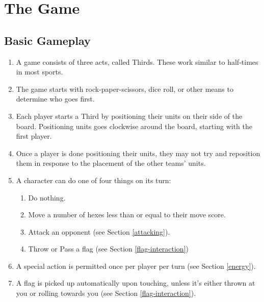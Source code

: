 \chapter{The Game}
\section{Basic Gameplay} \label{basic-gameplay}
\begin{enumerate}
    \item A game consists of three acts, called Thirds.
    These work similar to half-times in most sports.
    \item The game starts with rock-paper-scissors, dice roll, or other means to determine who goes first.
    \item Each player starts a Third by positioning their units on their side of the board.
    Positioning units goes clockwise around the board, starting with the first player.
    \item Once a player is done positioning their units, they may not try and reposition them in response to the placement of the other teams’ units.
    \item A character can do one of four things on its turn:
    \begin{enumerate}
        \item Do nothing.
        \item Move a number of hexes less than or equal to their move score.
        \item Attack an opponent (see Section \ref{attacking}).
        \item Throw or Pass a flag (see Section \ref{flag-interaction})
    \end{enumerate}
    \item A special action is permitted once per player per turn (see Section \ref{energy}).
    \item A flag is picked up automatically upon touching, unless it’s either thrown at you or rolling towards you (see Section \ref{flag-interaction}).
\end{enumerate}







